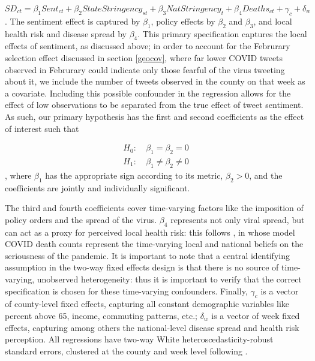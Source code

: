 \documentclass{article}
\begin{document}
\begin{equation}
  \label{eq:mainspec}
  SD_{ct} = \beta_1 Sent_{ct}  + \beta_2 StateStringency_{st} + \beta_3 NatStringency_{t} + \beta_4 Deaths_{ct} + \gamma_c + \delta_w
\end{equation}. The sentiment effect is captured by \(\beta_1\), policy effects by \(\beta_2\) and \(\beta_3\), and local health risk and disease spread by \(\beta_4\). This primary specification captures the local effects of sentiment, as discussed above; in order to account for the Februrary selection effect discussed in section \ref{geocov}, where far lower COVID tweets observed in Februrary could indicate only those fearful of the virus tweeting about it, we include the number of tweets observed in the county on that week as a covariate. Including this possible confounder in the regression allows for the effect of low observations to be separated from the true effect of tweet sentiment. As such, our primary hypothesis has the first and second coefficients as the effect of interest such that

\begin{align*}
  H_0 : &\: \beta_1 = \beta_2 = 0 \\
  H_1 : &\: \beta_1 \neq \beta_2 \neq 0
\end{align*}, where \(\beta_1\) has the appropriate sign according to its metric, \(\beta_2 > 0\), and the coefficients are jointly and individually significant.

The third and fourth coefficients cover time-varying factors like the imposition of policy orders and the spread of the virus. \(\beta_4\) represents not only viral spread, but can act as a proxy for perceived local health risk: this follows \textcite{chernozhukovCausalImpactMasks2021}, in whose model COVID death counts represent the time-varying local and national beliefs on the seriousness of the pandemic. It is important to note that a central identifying assumption in the two-way fixed effects design is that there is no source of time-varying, unobserved heterogeneity: thus it is important to verify that the correct specification is chosen for these time-varying confounders. Finally, \(\gamma_c\) is a vector of county-level fixed effects, capturing all constant demographic variables like percent above 65, income, commuting patterns, etc.; \(\delta_w\) is a vector of week fixed effects, capturing among others the national-level disease spread and health risk perception. All regressions have two-way White heteroscedasticity-robust standard errors, clustered at the county and week level following \parencite{abadieWhenShouldYou2017}.
\end{document}
